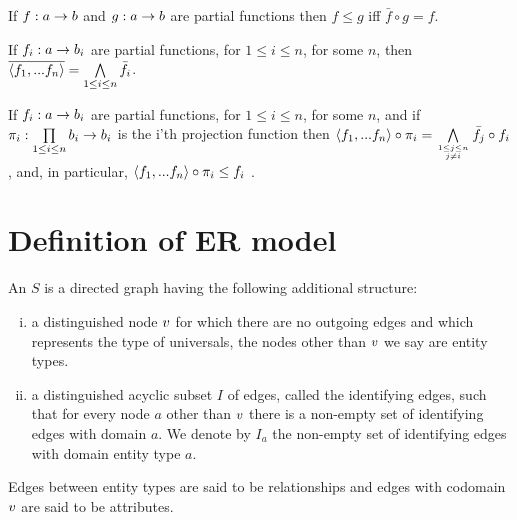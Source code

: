\begin{lemma}
If $f: a \rightarrow b$ and  $g: a \rightarrow b$ are partial functions then $f \leq g$ iff $\bar{f}\circ g= f$.
\end{lemma}

\begin{lemma}
If $f_i: a \rightarrow b_i$ are partial functions, for $1 \leq i \leq n$, for some $n$, then $\overline{\langle f_1,...f_n\rangle}=\bigwedge\limits_{1 \leq i \leq n}{\bar{f_i}}$.
\end{lemma}

\begin{lemma}
If $f_i: a \rightarrow b_i$ are partial functions, for $1 \leq i \leq n$, for some $n$, and if 
$\pi_i : \prod\limits_{1 \leq i \leq n}{b_i} \rightarrow b_i$ is the i'th projection function 
then  $\tuple{f_1,...f_n} \circ \proji{i} = \bigwedge\limits_{\genfrac{}{}{0pt}{}{1 \leq j \leq n}{ j \neq i}}{\bar{f_j}}\circ f_i$, and,
in particular, $\langle f_1,...f_n\rangle \circ \pi_i\leq f_i$ .
\end{lemma}


\section{Definition of ER model}

\begin{definition}
An  $S$ is a directed graph having the following additional structure:
\begin{enumerate} [(i)]
\item{a distinguished node $v$ for which there are no outgoing edges and which represents the type of universals, 
 the nodes other than $v$ we say are entity types.} 

\item{a distinguished acyclic subset $I$ of edges, called the identifying edges, such that
for every node $a$ other than $v$ there is a non-empty set  of identifying edges with domain $a$.
 We denote by $I_a$ the non-empty set of identifying edges with domain entity type $a$.}
\end{enumerate}
\begin{newtt}
Edges between entity types are said to be relationships and edges with codomain $v$ are said to be attributes.
\end{newtt}
\end{definition} 


